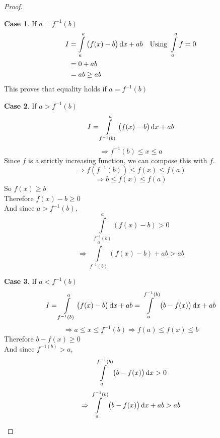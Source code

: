 \documentclass[14]{article}
\theoremstyle{definition}
\theoremstyle{case}
\newtheorem{case}{Case}
\begin{document}
\begin{proof}
\begin{case} {If $a = f^{-1}(b)$}
\begin{align*}
I &= \int\limits_a^a \left(f(x) - b\right) \dif x + ab && \text{Using } \int\limits_a^a f = 0\\
&= 0 + ab\\
&= ab \geq ab
\end{align*}
This proves that equality holds if $a = f^{-1}(b)$
\end{case}
\begin{case}
If $a > f^{-1}(b)$
\[I = \displaystyle\int\limits_{f^{-1}(b)}^a \left(f(x) - b\right) \dif x + ab\]
\[\Rightarrow f^{-1}(b) \leq x \leq a\]
Since $f$ is a strictly increasing function, we can compose this with $f$.
\[\Rightarrow f\left( f^{-1}(b) \right) \leq f(x) \leq f(a)\]
\[\Rightarrow b \leq f(x) \leq f(a)\]
So $f(x) \geq b$\\
Therefore $f(x) - b \geq 0$\\
And since $a > f^{-1}(b)$,
\[\int\limits_{f^{-1}(b)}^a \left( f(x) - b \right) > 0\]
\[\Rightarrow \int\limits_{f^{-1}(b)}^a \left( f(x) - b \right) + ab > ab\]
\end{case}
\begin{case}
If $a < f^{-1}(b)$
\[I = \displaystyle\int\limits_{f^{-1}(b)}^a \left(f(x) - b\right) \dif x + ab = \int\limits_a^{f^{-1}(b)} \left(b - f(x)\right) \dif x + ab\]
\[\Rightarrow a \leq x \leq f^{-1}(b) \Rightarrow f(a) \leq f(x) \leq b\]
Therefore $b - f(x) \geq 0$\\
And since $f^{-1(b)} > a$,
\[\int\limits_a^{f^{-1}(b)} \left(b - f(x)\right) \dif x > 0\]
\[\Rightarrow \int\limits_a^{f^{-1}(b)} \left(b - f(x)\right) \dif x + ab > ab\]
\end{case}
\end{proof}
\pagebreak
\end{document}
